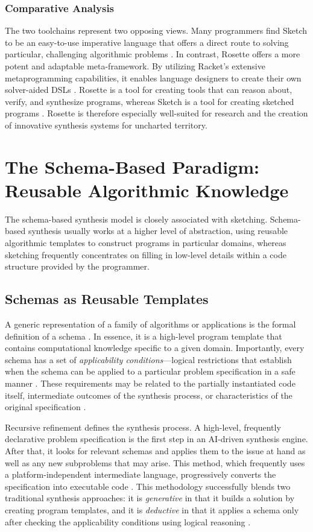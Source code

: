 \documentclass[12pt, a4paper]{report}
\begin{document}
\subsubsection{Comparative Analysis}
The two toolchains represent two opposing views. Many programmers find Sketch to be an easy-to-use imperative language that offers a direct route to solving particular, challenging algorithmic problems \citep{torlak2013rosette}. In contrast, Rosette offers a more potent and adaptable meta-framework. By utilizing Racket's extensive metaprogramming capabilities, it enables language designers to create their own solver-aided DSLs \citep{torlak2013rosette}. Rosette is a tool for creating tools that can reason about, verify, and synthesize programs, whereas Sketch is a tool for creating sketched programs \citep{torlak2013rosette}. Rosette is therefore especially well-suited for research and the creation of innovative synthesis systems for uncharted territory.

\section{The Schema-Based Paradigm: Reusable Algorithmic Knowledge}

The schema-based synthesis model is closely associated with sketching. Schema-based synthesis usually works at a higher level of abstraction, using reusable algorithmic templates to construct programs in particular domains, whereas sketching frequently concentrates on filling in low-level details within a code structure provided by the programmer.

\subsection{Schemas as Reusable Templates}
A generic representation of a family of algorithms or applications is the formal definition of a schema \citep{flener2004schema}. In essence, it is a high-level program template that contains computational knowledge specific to a given domain. Importantly, every schema has a set of \textit{applicability conditions}—logical restrictions that establish when the schema can be applied to a particular problem specification in a safe manner \citep{fischer2003autobayes}. These requirements may be related to the partially instantiated code itself, intermediate outcomes of the synthesis process, or characteristics of the original specification \citep{fischer2003autobayes}.

Recursive refinement defines the synthesis process. A high-level, frequently declarative problem specification is the first step in an AI-driven synthesis engine. After that, it looks for relevant schemas and applies them to the issue at hand as well as any new subproblems that may arise. This method, which frequently uses a platform-independent intermediate language, progressively converts the specification into executable code \citep{flener2004schema}. This methodology successfully blends two traditional synthesis approaches: it is \textit{generative} in that it builds a solution by creating program templates, and it is \textit{deductive} in that it applies a schema only after checking the applicability conditions using logical reasoning \citep{flener2004schema}.
\end{document}
